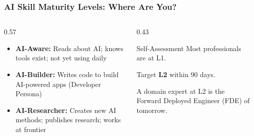 


\begin{frame}[fragile]\frametitle{AI Skill Maturity Levels: Where Are You?}
\begin{columns}
    \begin{column}[T]{0.57\linewidth}
\begin{itemize}
  \item[\textbf{L1}] \textbf{AI-Aware:} Reads about AI; knows tools exist; not yet using daily
  \item[\textbf{L2}] \textbf{AI-Builder:} Writes code to build AI-powered apps (Developer Persona)
  \item[\textbf{L3}] \textbf{AI-Researcher:} Creates new AI methods; publishes research; works at frontier
\end{itemize}
    \end{column}
    \begin{column}[T]{0.43\linewidth}
\begin{block}{Self-Assessment}
Most professionals are at L1.

\vspace{4pt}
Target \textbf{L2} within 90 days.

\vspace{4pt}
A domain expert at L2 is the Forward Deployed Engineer (FDE) of tomorrow.
\end{block}
    \end{column}
\end{columns}
\end{frame}

